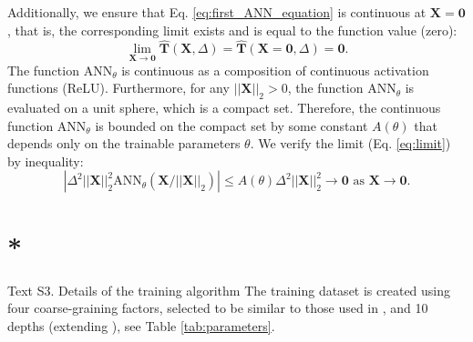 \documentclass[draft,grl]{agutexSI2019}
\begin{document}
\begin{article}
Additionally, we ensure that Eq. \eqref{eq:first_ANN_equation} is continuous at $\mathbf{X}=\mathbf{0}$, that is, the corresponding limit exists and is equal to the function value (zero):
\begin{equation}
    \lim_{\mathbf{X}\to\mathbf{0}} \widehat{\mathbf{T}}(\mathbf{X}, \Delta) = \widehat{\mathbf{T}}(\mathbf{X}=\mathbf{0}, \Delta) = \mathbf{0}. \label{eq:limit}
\end{equation}
The function $\mathrm{ANN}_{\theta}$ is continuous as a composition of continuous activation functions (ReLU). Furthermore, for any $||\mathbf{X}||_2>0$, the function $\mathrm{ANN}_{\theta}$ is evaluated on a unit sphere, which is a compact set. Therefore, the continuous function $\mathrm{ANN}_{\theta}$ is bounded on the compact set by some constant $A(\theta)$ that depends only on the trainable parameters $\theta$. We verify the limit (Eq. \eqref{eq:limit}) by inequality:
\begin{equation}
    \left|\Delta^2 ||\mathbf{X}||_2^2 \mathrm{ANN}_{\theta} (\mathbf{X} / ||\mathbf{X}||_2)\right| \leq A(\theta) \Delta^2 ||\mathbf{X}||_2^2 \to \mathbf{0} \text{ as } \mathbf{X}\to\mathbf{0}.
\end{equation}


\section{*}{Text S3. Details of the training algorithm} 
The training dataset is created using four coarse-graining factors, selected to be similar to those used in , and 10 depths (extending ), see Table \ref{tab:parameters}. %


\end{article}
\end{document}
